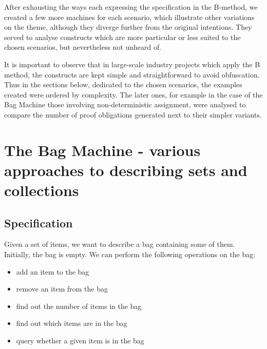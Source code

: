 \documentclass[11pt,journal]{IEEEtran}
\begin{document}
	After exhausting the ways each expressing the specification in the B-method, we created a few more machines for each scenario, which illustrate other variations on the theme, although they diverge further from the original intentions. They served to analyse constructs which are more particular or less suited to the chosen scenarios, but nevertheless not unheard of.
	
	It is important to observe that in large-scale industry projects which apply the B method, the constructs are kept simple and straightforward to avoid obfuscation. Thus in the sections below, dedicated to the chosen scenarios, the examples created were ordered by complexity. The later ones, for example in the case of the Bag Machine those involving non-deterministic assignment, were analysed to compare the number of proof obligations generated next to their simpler variants.
	
	\section{The Bag Machine - various approaches to describing sets and collections}
	\subsection{Specification}
	Given a set of items, we want to describe a bag containing some of them. Initially, the bag is empty. We can perform the following operations on the bag:
	\begin{itemize}
		\item add an item to the bag
		\item remove an item from the bag
		\item find out the number of items in the bag
		\item find out which items are in the bag
		\item query whether a given item is in the bag
	\end{itemize}
\end{document}
